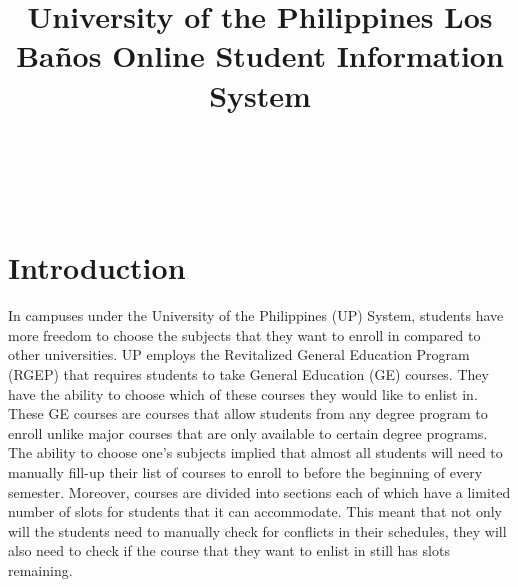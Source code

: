 \documentclass{sigchi}
\def\plaintitle{University of the Philippines Los Baños Online Student Information System}
\begin{document}
\title{\plaintitle}

\author{%
  \\
  \\
  \\
}

\maketitle

% 
% 

\section{Introduction}

In campuses under the University of the Philippines (UP) System, students have 
more freedom to choose the subjects that they want to enroll in compared to other
universities. UP employs the Revitalized General Education Program (RGEP) that
requires students to take General Education (GE) courses. They have the ability to
choose which of these courses they would like to enlist in.
These GE courses are courses that allow students from any degree program to enroll
unlike major courses that are only available to certain degree programs. The
ability to choose one’s subjects implied that almost all students will need to
manually fill-up their list of courses to enroll to before the beginning of 
every semester. Moreover, courses are divided into sections each of which have 
a limited number of slots for students that it can accommodate. This meant that 
not only will the students need to manually check for conflicts in their 
schedules, they will also need to check if the course that they want to enlist 
in still has slots remaining.
\end{document}
